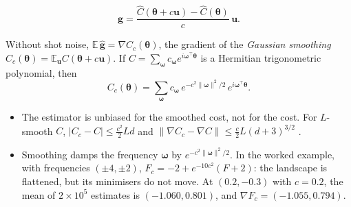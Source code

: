 \documentclass[handoutsbeamer.tex]{subfiles}
\begin{document}
\begin{frame}
\onp{\footnotesize}
\begin{equation}\label{eq:ch07:2pfa}
    \hat{\boldsymbol g} = \frac{\hat C(\boldsymbol\theta+c\boldsymbol u)-\hat C(\boldsymbol\theta)}{c}\,\boldsymbol u.
\end{equation}
\begin{lem}\label{lem:ch07:smooth}
Without shot noise, $\mathbb E\,\hat{\boldsymbol g} = \nabla C_c(\boldsymbol\theta)$, the gradient of the \emph{Gaussian smoothing} $C_c(\boldsymbol\theta) = \mathbb E_{\boldsymbol u}C(\boldsymbol\theta+c\boldsymbol u)$. If $C = \sum_{\boldsymbol\omega}c_{\boldsymbol\omega}e^{i\boldsymbol\omega^\top\boldsymbol\theta}$ is a Hermitian trigonometric polynomial, then
\begin{equation}\label{eq:ch07:smoothtrig}
    C_c(\boldsymbol\theta) = \sum_{\boldsymbol\omega}c_{\boldsymbol\omega}\,e^{-c^2\|\boldsymbol\omega\|^2/2}\,e^{i\boldsymbol\omega^\top\boldsymbol\theta}.
\end{equation}
\end{lem}
\begin{itemize}\setlength\itemsep{0.2em}
    \item The estimator is unbiased for the smoothed cost, not for the cost. For $L$-smooth $C$, $|C_c-C|\le\frac{c^2}2Ld$ and $\|\nabla C_c-\nabla C\|\le\frac c2L(d+3)^{3/2}$ \citep{Nesterov2015}.
    \item Smoothing damps the frequency $\boldsymbol\omega$ by $e^{-c^2\|\boldsymbol\omega\|^2/2}$. In the worked example, with frequencies $(\pm4,\pm2)$, $F_c = -2+e^{-10c^2}(F+2)$: the landscape is flattened, but its minimisers do not move. At $(0.2,-0.3)$ with $c = 0.2$, the mean of $2\times10^5$ estimates is $(-1.060,0.801)$, and $\nabla F_c = (-1.055,0.794)$.
\end{itemize}
\end{frame}
\end{document}
